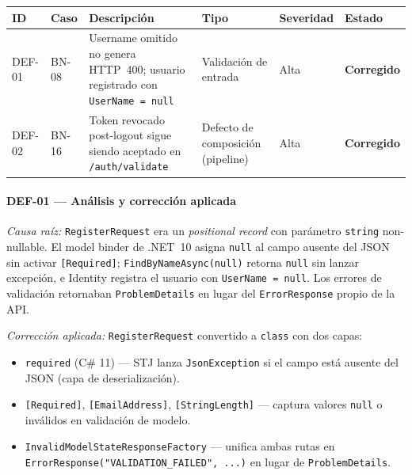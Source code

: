 \documentclass[11pt,a4paper]{article}
\begin{document}
\begin{center}
\renewcommand{\arraystretch}{1.5}
\begin{tabular}{|p{1.1cm}|p{1.2cm}|p{4.2cm}|p{2cm}|p{2cm}|p{1.8cm}|}
\hline
\rowcolor{headerblue}
\color{white}\textbf{ID} &
\color{white}\textbf{Caso} &
\color{white}\textbf{Descripción} &
\color{white}\textbf{Tipo} &
\color{white}\textbf{Severidad} &
\color{white}\textbf{Estado} \\
\hline
DEF-01 & BN-08 &
  Username omitido no genera HTTP~400; usuario registrado con \texttt{UserName = null} &
  Validación de entrada &
  Alta &
  \textbf{Corregido} \\
\hline
\rowcolor{rowgray}
DEF-02 & BN-16 &
  Token revocado post-logout sigue siendo aceptado en \texttt{/auth/validate} &
  Defecto de composición (pipeline) &
  Alta &
  \textbf{Corregido} \\
\hline
\end{tabular}
\end{center}

\vspace{0.4cm}

{\sloppy
\paragraph*{DEF-01 — Análisis y corrección aplicada}

\textit{Causa raíz:} \texttt{RegisterRequest} era un \textit{positional record} con parámetro
\texttt{string} non-nullable. El model binder de .NET~10 asigna \texttt{null} al campo ausente
del JSON sin activar \texttt{[Required]}; \texttt{FindByNameAsync(null)} retorna \texttt{null}
sin lanzar excepción, e Identity registra el usuario con \texttt{UserName = null}.
Los errores de validación retornaban \texttt{ProblemDetails} en lugar del \texttt{ErrorResponse}
propio de la API.

\textit{Corrección aplicada:} \texttt{RegisterRequest} convertido a \texttt{class} con dos capas:
\begin{itemize}[itemsep=1pt, topsep=2pt]
    \item \texttt{required} (C\# 11) — STJ lanza \texttt{JsonException} si el campo está ausente
          del JSON (capa de deserialización).
    \item \texttt{[Required]}, \texttt{[EmailAddress]}, \texttt{[StringLength]} — captura valores
          \texttt{null} o inválidos en validación de modelo.
    \item \texttt{InvalidModelStateResponseFactory} — unifica ambas rutas en
          \texttt{ErrorResponse("VALIDATION\_FAILED",~...)} en lugar de \texttt{ProblemDetails}.
\end{itemize}
}%
\end{document}
